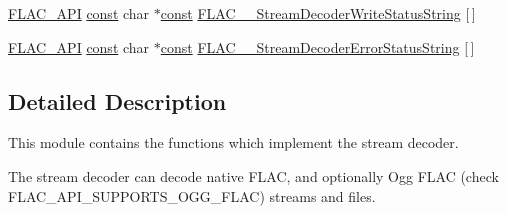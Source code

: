 \begin{DoxyCompactItemize}
\item 
\hyperlink{group__flac__export_ga56ca07df8a23310707732b1c0007d6f5}{F\+L\+A\+C\+\_\+\+A\+PI} \hyperlink{zconf_8h_a2c212835823e3c54a8ab6d95c652660e}{const} char $\ast$\hyperlink{zconf_8h_a2c212835823e3c54a8ab6d95c652660e}{const} \hyperlink{group__flac__stream__decoder_gae0c0c4f29a8524aedc58778504923297}{F\+L\+A\+C\+\_\+\+\_\+\+Stream\+Decoder\+Write\+Status\+String} \mbox{[}$\,$\mbox{]}
\item 
\hyperlink{group__flac__export_ga56ca07df8a23310707732b1c0007d6f5}{F\+L\+A\+C\+\_\+\+A\+PI} \hyperlink{zconf_8h_a2c212835823e3c54a8ab6d95c652660e}{const} char $\ast$\hyperlink{zconf_8h_a2c212835823e3c54a8ab6d95c652660e}{const} \hyperlink{group__flac__stream__decoder_gadc56befa033b67dd3befcd2f5f909ec1}{F\+L\+A\+C\+\_\+\+\_\+\+Stream\+Decoder\+Error\+Status\+String} \mbox{[}$\,$\mbox{]}
\end{DoxyCompactItemize}


\subsection{Detailed Description}
This module contains the functions which implement the stream decoder. 

The stream decoder can decode native F\+L\+AC, and optionally Ogg F\+L\+AC (check F\+L\+A\+C\+\_\+\+A\+P\+I\+\_\+\+S\+U\+P\+P\+O\+R\+T\+S\+\_\+\+O\+G\+G\+\_\+\+F\+L\+AC) streams and files.

